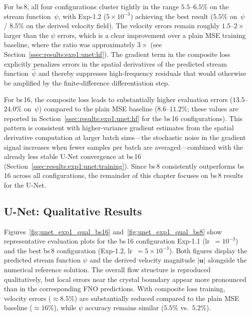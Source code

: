 For bs\,8, all four configurations cluster tightly in the range $5.5$–$6.5\%$ on the stream function~$\psi$, with Exp-1.2 ($5\times10^{-3}$) achieving the best result ($5.5\%$ on~$\psi$ / $8.5\%$ on the derived velocity field). The velocity errors remain roughly $1.5$–$2\times$ larger than the $\psi$ errors, which is a clear improvement over a plain MSE training baseline, where the ratio was approximately $3\times$ (see Section~\ref{ssec:results:exp1:unet:hf}). The gradient term in the composite loss explicitly penalizes errors in the spatial derivatives of the predicted stream function~$\hat{\psi}$ and thereby suppresses high-frequency residuals that would otherwise be amplified by the finite-difference differentiation step.

For bs\,16, the composite loss leads to substantially higher evaluation errors ($13.5$–$24.0\%$ on~$\psi$) compared to the plain MSE baseline ($8.6$–$11.2\%$; these values are reported in Section~\ref{ssec:results:exp1:unet:hf} for the bs\,16 configurations). This pattern is consistent with higher-variance gradient estimates from the spatial derivative computation at larger batch sizes—the stochastic noise in the gradient signal increases when fewer samples per batch are averaged—combined with the already less stable U-Net convergence at bs\,16 (Section~\ref{ssec:results:exp1:unet:training}). Since bs\,8 consistently outperforms bs\,16 across all configurations, the remainder of this chapter focuses on bs\,8 results for the U-Net.

\subsection{U-Net: Qualitative Results}
\label{ssec:results:exp1:unet:qualitative}

Figures~\ref{fig:unet_exp1_qual_bs16} and~\ref{fig:unet_exp1_qual_bs8} show representative evaluation plots for the bs\,16 configuration Exp-1.1 (lr~$=10^{-3}$) and the best bs\,8 configuration (Exp-1.2, lr~$=5\times10^{-3}$). Both figures display the predicted stream function $\psi$ and the derived velocity magnitude $|\mathbf{u}|$ alongside the numerical reference solution. The overall flow structure is reproduced qualitatively, but local errors near the crystal boundary appear more pronounced than in the corresponding FNO predictions. With composite loss training, velocity errors ($\approx 8.5\%$) are substantially reduced compared to the plain MSE baseline ($\approx 16\%$), while $\psi$ accuracy remains similar ($5.5\%$ vs.\ $5.2\%$).

